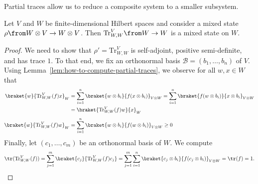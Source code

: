 \documentclass[a4paper,oneside, 12pt]{amsart}
\begin{document}
Partial traces allow us to reduce a composite system to a smaller subsystem.

\begin{proposition}\label{prop:reduction-via-partial-trace}
  Let \(V\) and \(W\) be finite-dimensional Hilbert spaces and consider a mixed state \(\rho \from W\otimes V \to W\otimes V\).
  Then \(\mathrm{Tr}^{V}_{W,W} \from W\to W\) is a mixed state on \(W\).
\end{proposition}

\begin{proof}
  We need to show that \( \rho'= \mathrm{Tr}^{V}_{W,W}\) is self-adjoint, positive semi-definite, and has trace \(1\).
  To that end, we fix an orthonormal basis \(\mathcal{B} = (b_{1}, \dots , b_{n})\) of \(V\).
  Using Lemma~\ref{lem:how-to-compute-partial-traces}, we observe for all \(w,x\in W\) that
  \begin{align*}
    \braket{w}{\mathrm{Tr}_{W,W}^{V}(f) x}_{W}
    & = \sum_{i=1}^{n} \braket{w \otimes b_{i}}{f(x\otimes b_{i})}_{V\otimes W}
      = \sum_{i=1}^{n} \braket{f(w \otimes b_{i})}{x\otimes b_{i}}_{V\otimes W}\\
    &  = \braket{\mathrm{Tr}_{W,W}^{V}(f) w}{x}_{W}\\[0.25\baselineskip]
    \braket{w}{\mathrm{Tr}_{W,W}^{V}(f) w}_{W}
     & = \sum_{i=1}^{n} \braket{w \otimes b_{i}}{f(w\otimes b_{i})}_{V\otimes W}\geq 0
  \end{align*}
  Finally, let \((c_{1}, \dots , c_{m})\) be an orthonormal basis of \(W\).
  We compute
  \begin{equation*}
    \tr(\mathrm{Tr}_{W,W}^{V}(f))
    = \sum_{j=1}^{m}\braket{c_{j}}{\mathrm{Tr}_{W,W}^{V}(f)c_{j}}
    = \sum_{j=1}^{m}\sum_{i=1}^{n} \braket{c_{j} \otimes b_{i}}{f(c_{j}\otimes b_{i})}_{V\otimes W}
    = \tr(f)
    = 1.\qedhere
  \end{equation*}
\end{proof}
\end{document}
